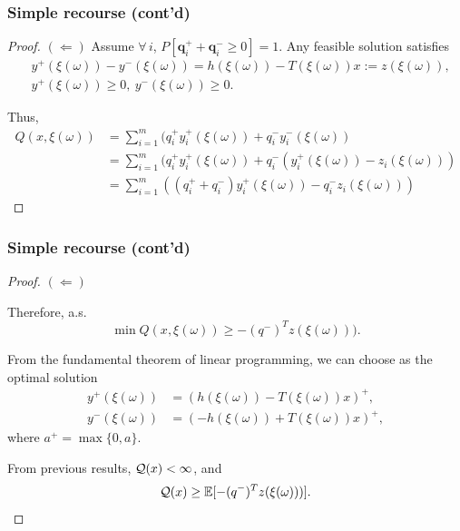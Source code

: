 \documentclass{beamer}
\begin{document}
\begin{frame}
\frametitle{Simple recourse (cont'd)}
	
\begin{proof}

{\bf $(\Leftarrow)$}
Assume $\forall\, i$, $P[\boldsymbol{q}_i^+ + \boldsymbol{q}_i^- \geq 0] = 1$.
Any feasible solution satisfies
\begin{align*}
& y^+(\xi(\omega))-y^-(\xi(\omega))=h(\xi(\omega))-T(\xi(\omega))x := z(\xi(\omega)), \\
& y^+(\xi(\omega)) \geq 0,\ y^-(\xi(\omega)) \geq 0.
\end{align*}

Thus,
\begin{align*}
Q(x,\xi(\omega)) &= \sum_{i=1}^{m} (q_i^+y_i^+(\xi(\omega)) + q_i^-y_i^-(\xi(\omega)) \\
&= \sum_{i=1}^{m} (q_i^+y_i^+(\xi(\omega)) + q_i^-(y_i^+(\xi(\omega))-z_i(\xi(\omega))) \\
&= \sum_{i=1}^{m} ((q_i^+ + q_i^-)y_i^+(\xi(\omega))-q_i^-z_i(\xi(\omega)))
\end{align*}

\end{proof}

\end{frame}

\begin{frame}
\frametitle{Simple recourse (cont'd)}

\begin{proof}
{\bf $(\Leftarrow)$}

Therefore, a.s.
$$
\min Q(x,\xi(\omega)) \geq -(q^-)^Tz(\xi(\omega))).
$$

From the fundamental theorem of linear programming, we can choose as the optimal solution
\begin{align*}
	y^+(\xi(\omega)) &= \left(h(\xi(\omega))-T(\xi(\omega))x\right)^+,\\
	y^-(\xi(\omega)) &= \left(-h(\xi(\omega))+T(\xi(\omega))x\right)^+,
\end{align*}
where $a^+ = \max\{0, a\}$.

From previous results, ${\mathcal{Q}}(x) < \infty$, and
$$
{\mathcal{Q}}(x) \geq {\mathbb{E}}[-(q^-)^Tz(\xi(\omega)))].
$$
\end{proof}

\end{frame}
\end{document}
